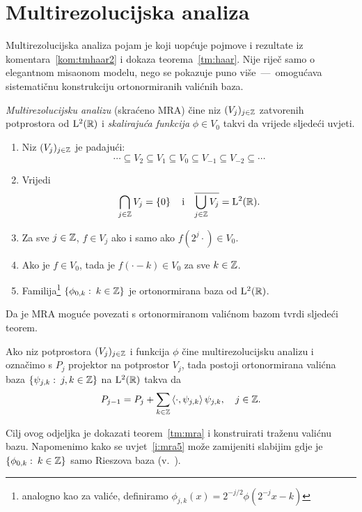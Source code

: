 \documentclass[main.tex]{subfiles}
\begin{document}
\section{Multirezolucijska analiza}\label{sec:mra}
Multirezolucijska analiza pojam je koji uopćuje
pojmove i rezultate iz komentara~\ref{kom:tmhaar2}
i dokaza teorema~\ref{tm:haar}.
Nije riječ samo o elegantnom misaonom modelu, nego
se pokazuje puno više~---~omogućava sistematičnu konstrukciju
ortonormiranih valićnih baza.

\begin{definicija}
	\emph{Multirezolucijsku analizu} (skraćeno MRA)
	čine niz \( (V_j)_{j \in \mathbb{Z}} \) zatvorenih potprostora od \( \mathrm{L}^2(\mathbb{R}) \)
	i \emph{skalirajuća funkcija} \( \phi \in V_0 \) takvi da vrijede sljedeći uvjeti.
	\begin{enumerate}[label=(MRA\arabic*)]
		\item Niz \( (V_j)_{j \in \mathbb{Z}} \) je padajući:
		      \begin{equation}
			      \cdots \subseteq V_2 \subseteq V_1 \subseteq V_0
			      \subseteq V_{-1} \subseteq V_{-2} \subseteq \cdots
		      \end{equation} \label{i:mra1}
		\item Vrijedi
		      \begin{equation}
			      \bigcap_{j \in \mathbb{Z}} V_j = \left\{ 0 \right\}
			      \quad \text i \quad
			      \overline{\bigcup_{j \in \mathbb{Z}} V_j} = \mathrm{L}^2(\mathbb{R}).
		      \end{equation} \label{i:mra2}

		\item Za sve \( j \in \mathbb{Z} \), \( f \in V_j \) ako i samo ako \( f(2^j\cdot) \in V_0 \). \label{i:mra3}
		\item Ako je \( f \in V_0 \), tada je \( f(\cdot - k) \in V_0 \) za sve \( k \in \mathbb{Z} \). \label{i:mra4}
		\item Familija\footnote{analogno kao za valiće, definiramo \( \phi_{j,k}(x)=2^{-j/2}\phi(2^{-j}x-k)\)} \( \left\{ \phi_{0,k} \, \colon \, k \in \mathbb{Z} \right\} \) je ortonormirana baza od
		      \( \mathrm{L}^2(\mathbb{R}) \). \label{i:mra5}
	\end{enumerate}
\end{definicija}

Da je MRA moguće povezati s ortonormiranom valićnom bazom tvrdi sljedeći teorem.

\begin{teorem}\label{tm:mra}
	Ako niz potprostora \( (V_j)_{j \in \mathbb{Z}} \) i funkcija \( \phi \)
	čine multirezolucijsku analizu i označimo s \( P_j \)
	projektor na potprostor \( V_j \),
	tada postoji
	ortonormirana valićna baza \( \left\{ \psi_{j,k} \, \colon \, j,k\in\mathbb{Z} \right\} \) na \( \mathrm{L}^2(\mathbb{R}) \) takva da
	\begin{equation}\label{eq:mrapj}
		P_{j-1} = P_j + \sum_{k \in \mathbb{Z}} \left\langle {\cdot}, {\psi_{j,k}} \right\rangle\psi_{j,k}, \quad j \in \mathbb{Z}.
	\end{equation}
\end{teorem}
\noindent Cilj ovog odjeljka je dokazati teorem~\ref{tm:mra} i konstruirati
traženu valićnu bazu. Napomenimo kako se uvjet~\ref{i:mra5} može zamijeniti slabijim
gdje je \( \left\{ \phi_{0,k} \, \colon \, k \in \mathbb{Z} \right\} \) samo Rieszova baza (v.~\cite[]{daub}).
\end{document}
